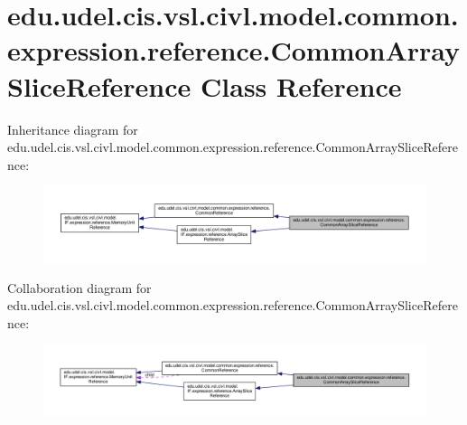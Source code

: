 \hypertarget{classedu_1_1udel_1_1cis_1_1vsl_1_1civl_1_1model_1_1common_1_1expression_1_1reference_1_1CommonArraySliceReference}{}\section{edu.\+udel.\+cis.\+vsl.\+civl.\+model.\+common.\+expression.\+reference.\+Common\+Array\+Slice\+Reference Class Reference}
\label{classedu_1_1udel_1_1cis_1_1vsl_1_1civl_1_1model_1_1common_1_1expression_1_1reference_1_1CommonArraySliceReference}


Inheritance diagram for edu.\+udel.\+cis.\+vsl.\+civl.\+model.\+common.\+expression.\+reference.\+Common\+Array\+Slice\+Reference\+:
\nopagebreak
\begin{figure}[H]
\begin{center}
\leavevmode
\includegraphics[width=350pt]{classedu_1_1udel_1_1cis_1_1vsl_1_1civl_1_1model_1_1common_1_1expression_1_1reference_1_1CommonAraa2273bd49a3eebb4a4c34fbcf0bdec2}
\end{center}
\end{figure}


Collaboration diagram for edu.\+udel.\+cis.\+vsl.\+civl.\+model.\+common.\+expression.\+reference.\+Common\+Array\+Slice\+Reference\+:
\nopagebreak
\begin{figure}[H]
\begin{center}
\leavevmode
\includegraphics[width=350pt]{classedu_1_1udel_1_1cis_1_1vsl_1_1civl_1_1model_1_1common_1_1expression_1_1reference_1_1CommonArraySliceReference__coll__graph}
\end{center}
\end{figure}
